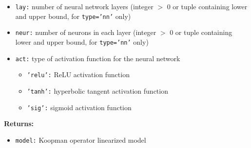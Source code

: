 \documentclass{article}
\begin{document}
\begin{itemize}
	\item \texttt{lay:} number of neural network layers (integer $>$ 0 or tuple containing lower and upper bound, for \texttt{type='nn'} only)
	\item \texttt{neur:} number of neurons in each layer (integer $>$ 0 or tuple containing lower and upper bound, for \texttt{type='nn'} only)
	\item \texttt{act:} type of activation function for the neural network
		\begin{itemize}
			\item \texttt{'relu':} ReLU activation function
			\item \texttt{'tanh':} hyperbolic tangent activation function
			\item \texttt{'sig':} sigmoid activation function
		\end{itemize}
\end{itemize}	
	
\noindent \textbf{Returns:}	
	
\begin{itemize}
	\item \texttt{model:} Koopman operator linearized model
\end{itemize}	
	
\end{document}

